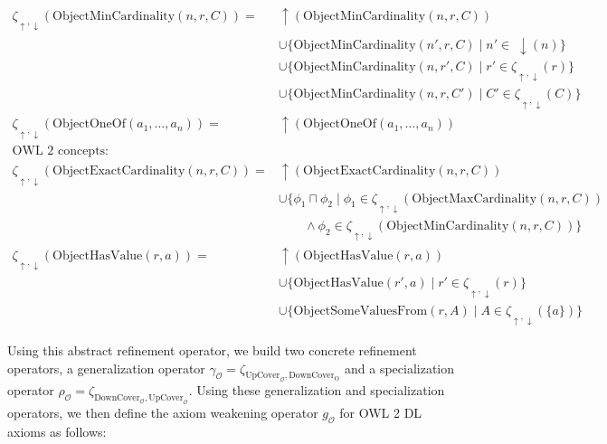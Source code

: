 \begin{align*}
    \zeta_{\uparrow, \downarrow}(\mathrm{ObjectMinCardinality}(n, r, C)) ={} & \uparrow (\mathrm{ObjectMinCardinality}(n, r, C)) \\& \cup \{\mathrm{ObjectMinCardinality}(n', r, C) \mid n' \in \; \downarrow (n)\} \\& \cup \{\mathrm{ObjectMinCardinality}(n, r', C) \mid r' \in \zeta_{\uparrow, \downarrow}(r)\} \\& \cup \{\mathrm{ObjectMinCardinality}(n, r, C') \mid C' \in \zeta_{\uparrow, \downarrow} (C)\} \\
    \zeta_{\uparrow, \downarrow}(\mathrm{ObjectOneOf}(a_1, \dots, a_n)) ={} & \uparrow (\mathrm{ObjectOneOf}(a_1, \dots, a_n)) \\
    \text{OWL 2 concepts:} \quad & \\
    \zeta_{\uparrow, \downarrow}(\mathrm{ObjectExactCardinality}(n, r, C)) ={} & \uparrow (\mathrm{ObjectExactCardinality}(n, r, C)) \\& \cup \{ \phi_1 \sqcap \phi_2   \mid \phi_1 \in \zeta_{\uparrow, \downarrow} (\mathrm{ObjectMaxCardinality}(n, r, C)) \\ \;& \qquad \land \phi_2 \in \zeta_{\uparrow, \downarrow} (\mathrm{ObjectMinCardinality}(n, r, C)) \} \\
    \zeta_{\uparrow, \downarrow}(\mathrm{ObjectHasValue}(r, a)) ={} & \uparrow (\mathrm{ObjectHasValue}(r, a)) \\&  \cup \{\mathrm{ObjectHasValue}(r', a) \mid r' \in \zeta_{\uparrow, \downarrow} (r)\} \\&  \cup \{\mathrm{ObjectSomeValuesFrom}(r, A) \mid A \in \zeta_{\uparrow, \downarrow}  (\{a\})\}
\end{align*}
\endgroup

Using this abstract refinement operator, we build two concrete refinement operators, a generalization operator $\gamma_\mathcal{O} = \zeta_{\mathrm{UpCover}_\mathcal{O}, \mathrm{DownCover}_\mathrm{O}}$ and a specialization operator $\rho_\mathcal{O} = \zeta_{\mathrm{DownCover}_\mathcal{O}, \mathrm{UpCover}_\mathcal{O}}$. Using these generalization and specialization operators, we then define the axiom weakening operator $g_\mathcal{O}$ for OWL 2 DL axioms as follows:

